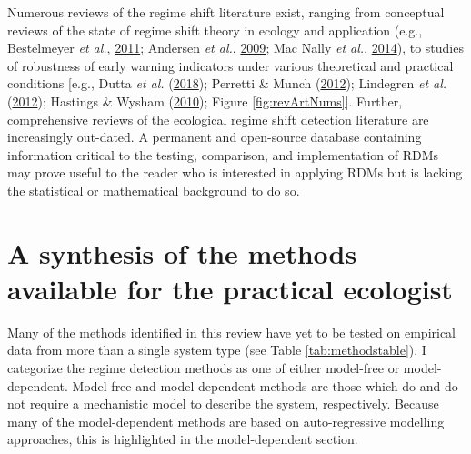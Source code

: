 \documentclass[12pt,twoside,openany]{reedthesis}
\begin{document}
Numerous reviews of the regime shift literature exist, ranging from conceptual reviews of the state of regime shift theory in ecology and application (e.g., Bestelmeyer \emph{et al.}, \protect\hyperlink{ref-bestelmeyer_analysis_2011}{2011}; Andersen \emph{et al.}, \protect\hyperlink{ref-andersen_ecological_2009}{2009}; Mac Nally \emph{et al.}, \protect\hyperlink{ref-mac2014scrutiny}{2014}), to studies of robustness of early warning indicators under various theoretical and practical conditions {[}e.g., Dutta \emph{et al.} (\protect\hyperlink{ref-dutta2018robustness}{2018}); Perretti \& Munch (\protect\hyperlink{ref-perretti2012regime}{2012}); Lindegren \emph{et al.} (\protect\hyperlink{ref-lindegren_early_2012}{2012}); Hastings \& Wysham (\protect\hyperlink{ref-hastings2010regime}{2010}); Figure \ref{fig:revArtNums}{]}. Further, comprehensive reviews of the ecological regime shift detection literature are increasingly out-dated. A permanent and open-source database containing information critical to the testing, comparison, and implementation of RDMs may prove useful to the reader who is interested in applying RDMs but is lacking the statistical or mathematical background to do so.

\hypertarget{a-synthesis-of-the-methods-available-for-the-practical-ecologist}{%
\section{A synthesis of the methods available for the practical ecologist}\label{a-synthesis-of-the-methods-available-for-the-practical-ecologist}}

Many of the methods identified in this review have yet to be tested on empirical data from more than a single system type (see Table \ref{tab:methodstable}). I categorize the regime detection methods as one of either model-free or model-dependent. Model-free and model-dependent methods are those which do and do not require a mechanistic model to describe the system, respectively. Because many of the model-dependent methods are based on auto-regressive modelling approaches, this is highlighted in the model-dependent section.
\end{document}
